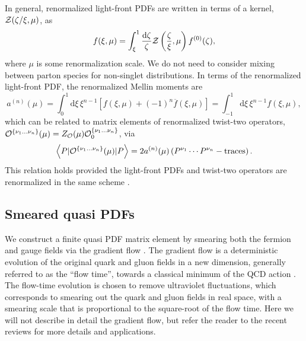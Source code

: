 In general, renormalized light-front PDFs are written in terms of a 
kernel, ${\cal Z}(\zeta/\xi,\mu)$, as
\begin{equation}
f(\xi,\mu) = \int_\xi^1 \frac{\mathrm{d}\zeta}{\zeta}{\cal 
Z}\left(\frac{\zeta}{\xi},\mu\right)f^{(0)}(\zeta),
\end{equation}
where $\mu$ is some renormalization 
scale. We do not need to consider mixing between parton species for 
non-singlet distributions. In terms of the renormalized light-front PDF, the 
renormalized Mellin 
moments are
\begin{equation}
a^{(n)}(\mu) = \int_0^1 \mathrm{d}\xi\,\xi^{n-1}\left[
f(\xi,\mu)+(-1)^n\overline{f}(\xi,\mu)\right] = \int_{-1}^1 
\mathrm{d}\xi\,\xi^{n-1}
f(\xi,\mu),
\end{equation}
which can be related to matrix elements of renormalized twist-two operators, 
${\cal O}^{\{\nu_1\ldots \nu_n\}}(\mu) =Z_{\cal O}(\mu){\cal 
O}_0^{\{\nu_1\ldots \nu_n\}}$, via
\begin{equation}\label{eq:RopePDF}
\left\langle P | {\cal O}^{\{\nu_1\ldots \nu_n\}}(\mu) | P 
\right\rangle = 2a^{(n)}(\mu) \left(P^{\nu_1}\cdots P^{\nu_n} - 
\mathrm{traces}\right).
\end{equation}
This relation holds provided the light-front PDFs and twist-two operators are 
renormalized in the same scheme \cite{Collins:1981uw}.



\subsection{Smeared  quasi PDFs}

We construct a finite quasi PDF matrix element by smearing both the fermion and 
gauge fields via the gradient flow 
\cite{Narayanan:2006rf,Luscher:2011bx,Luscher:2013cpa}. The gradient flow is a 
deterministic 
evolution of the original quark and gluon fields in a new dimension, 
generally referred to as the ``flow time'', towards a classical minimum of the 
QCD action \cite{Luscher:2011bx,Luscher:2013cpa}. The flow-time evolution is 
chosen to remove ultraviolet fluctuations, which corresponds to smearing out 
the quark and gluon fields in real space, with a smearing scale that is 
proportional to the square-root of the flow time. Here we will not describe in 
detail the gradient flow, but refer the reader to the recent reviews 
\cite{Luscher:2013vga,Ramos:2015dla} for more details and applications. 

